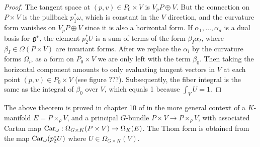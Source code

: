 \begin{proof}
	The tangent space at $(p,v)\in P_0\times V$ 
	is $V_pP \oplus V$. But the connection on $P\times V$ is the pullback 
	$p_1^*\omega$, which is constant in the $V$ direction, and the curvature
	form vanishes on  $V_pP\oplus V$ since it is also a horizontal form. 
	If $\alpha_1,\ldots,\alpha_d$ is a dual basis for
	$\operatorname{\mathfrak{g}}^*$, the element $p_2^*U$ is a sum of terms of the form 
	$\beta_I \alpha_I$, where  $\beta_I \in \Omega(P\times V)$ are invariant
	forms. 
	After we replace the $\alpha_i$ by the curvature forms  $\Omega_i$, as a
	form on $P_0\times V$ we are only left with the term $\beta_0$. 
	Then taking the horizontal component amounts to only evaluating tangent
	vectors in $V$ at each point $(p,v)\in P_0\times V$ (see figure ???). 
	Subsequently, the fiber integral is the same as the integral of 
	$\beta_0$ over $V$, which equals 1 because $\int_V U = 1$.  

\end{proof}

The above theorem is proved in chapter 10 of \cite{guillemin} in the more
general context of a $K$-manifold $E=P\times_\rho V$, and a principal
$G$-bundle  $P\times V \to P\times_\rho V$, with associated Cartan map
$\operatorname{Car}_\omega : \Omega_{G\times K}(P\times V)\to\Omega_K(E)$. The Thom form is
obtained from the map $\operatorname{Car}_{\omega}(p_2^*U)$ where $U\in\Omega_{G\times K}(V)$.

